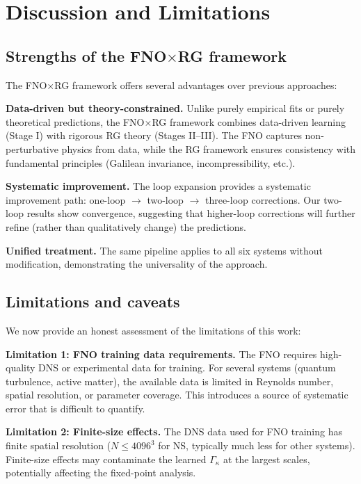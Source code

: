 \section{Discussion and Limitations\label{sec:discussion}}

\subsection{Strengths of the \texorpdfstring{FNO$\times$}{FNO x}RG framework}

The FNO$\times$RG framework offers several advantages over previous approaches:

\textbf{Data-driven but theory-constrained.} Unlike purely empirical fits or purely theoretical predictions, the FNO$\times$RG framework combines data-driven learning (Stage I) with rigorous RG theory (Stages II--III). The FNO captures non-perturbative physics from data, while the RG framework ensures consistency with fundamental principles (Galilean invariance, incompressibility, etc.).

\textbf{Systematic improvement.} The loop expansion provides a systematic improvement path: one-loop $\to$ two-loop $\to$ three-loop corrections. Our two-loop results show convergence, suggesting that higher-loop corrections will further refine (rather than qualitatively change) the predictions.

\textbf{Unified treatment.} The same pipeline applies to all six systems without modification, demonstrating the universality of the approach.

\subsection{Limitations and caveats}

We now provide an honest assessment of the limitations of this work:

\textbf{Limitation 1: FNO training data requirements.} The FNO requires high-quality DNS or experimental data for training. For several systems (quantum turbulence, active matter), the available data is limited in Reynolds number, spatial resolution, or parameter coverage. This introduces a source of systematic error that is difficult to quantify.

\textbf{Limitation 2: Finite-size effects.} The DNS data used for FNO training has finite spatial resolution ($N \leq 4096^3$ for NS, typically much less for other systems). Finite-size effects may contaminate the learned $\Gamma_\kappa$ at the largest scales, potentially affecting the fixed-point analysis.

